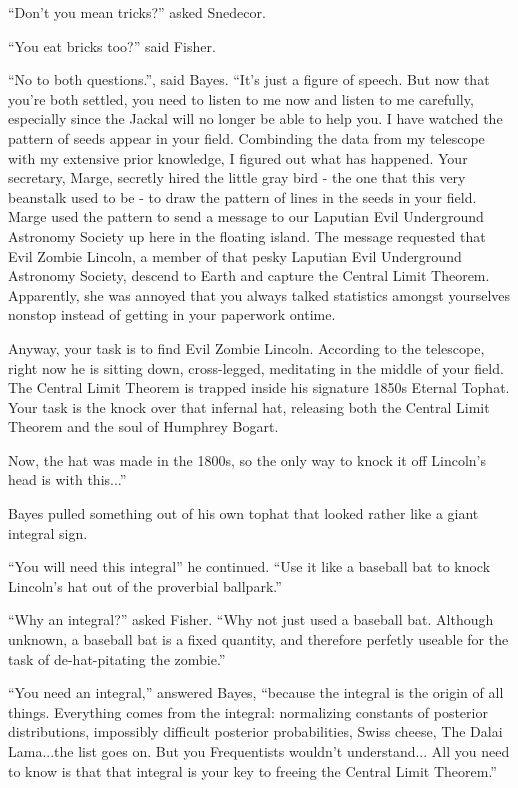 \documentclass{article}
\begin{document}
``Don't you mean tricks?'' asked Snedecor. 

``You eat bricks too?'' said Fisher. 

``No to both questions.'', said Bayes. ``It's just a figure of speech. But now that you're both settled, you need to listen to me now and listen to me carefully, especially since the Jackal will no longer be able to help you. I have watched the pattern of seeds appear in your field. Combinding the data from my telescope with my extensive prior knowledge, I figured out what has happened. Your secretary, Marge, secretly hired the little gray bird - the one that this very beanstalk used to be - to draw the pattern of lines in the seeds in your field. Marge used the pattern to send a message to our Laputian Evil Underground Astronomy Society up here in the floating island. The message requested that Evil Zombie Lincoln, a member of that pesky Laputian Evil Underground Astronomy Society, descend to Earth and capture the Central Limit Theorem. Apparently, she was annoyed that you always talked statistics amongst yourselves nonstop instead of getting in your paperwork ontime. 

Anyway, your task is to find Evil Zombie Lincoln. According to the telescope, right now he is sitting down, cross-legged, meditating in the middle of your field. The Central Limit Theorem is trapped inside his signature 1850s Eternal Tophat. Your task is the knock over that infernal hat, releasing both the Central Limit Theorem and the soul of Humphrey Bogart. 

Now, the hat was made in the 1800s, so the only way to knock it off Lincoln's head is with this...'' 

Bayes pulled something out of his own tophat that looked rather like a giant integral sign. 

``You will need this integral'' he continued. ``Use it like a baseball bat to knock Lincoln's hat out of the proverbial ballpark.'' 

``Why an integral?'' asked Fisher. ``Why not just used a baseball bat. Although unknown, a baseball bat is a fixed quantity, and therefore perfetly useable for the task of de-hat-pitating the zombie.'' 

``You need an integral,'' answered Bayes, ``because the integral is the origin of all things. Everything comes from the integral: normalizing constants of posterior distributions, impossibly difficult posterior probabilities, Swiss cheese, The Dalai Lama...the list goes on. But you Frequentists wouldn't understand... All you need to know is that that integral is your key to freeing the Central Limit Theorem.'' 
\end{document}
